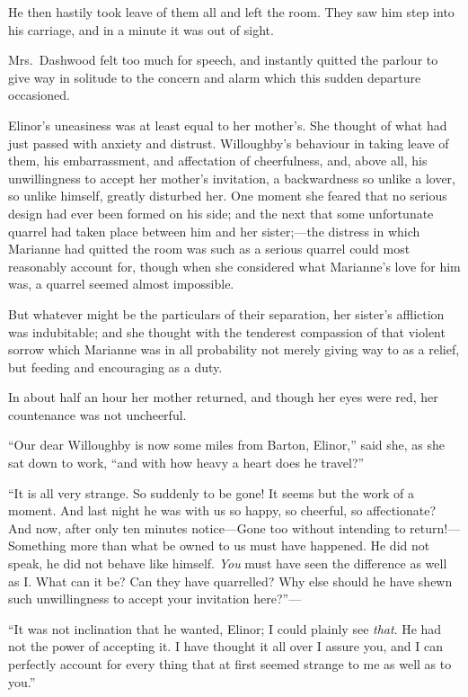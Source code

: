 \documentclass{article}
\begin{document}
He then hastily took leave of them all and left
the room.  They saw him step into his carriage,
and in a minute it was out of sight.

Mrs.\ Dashwood felt too much for speech, and instantly
quitted the parlour to give way in solitude to the concern
and alarm which this sudden departure occasioned.

Elinor's uneasiness was at least equal to her mother's.
She thought of what had just passed with anxiety and distrust.
Willoughby's behaviour in taking leave of them, his
embarrassment,
and affectation of cheerfulness, and, above all, his
unwillingness
to accept her mother's invitation, a backwardness so unlike a
lover,
so unlike himself, greatly disturbed her.  One moment she feared
that no serious design had ever been formed on his side; and the
next that some unfortunate quarrel had taken place between him
and
her sister;---the distress in which Marianne had quitted the room
was such as a serious quarrel could most reasonably account for,
though when she considered what Marianne's love for him was,
a quarrel seemed almost impossible.

But whatever might be the particulars of their separation,
her sister's affliction was indubitable; and she thought
with the tenderest compassion of that violent sorrow
which Marianne was in all probability not merely giving
way to as a relief, but feeding and encouraging as a duty.

In about half an hour her mother returned, and though
her eyes were red, her countenance was not uncheerful.

``Our dear Willoughby is now some miles from Barton, Elinor,''
said she, as she sat down to work, ``and with how heavy a heart
does he travel?''

``It is all very strange.  So suddenly to be gone! It
seems but the work of a moment.  And last night he was
with us so happy, so cheerful, so affectionate?  And now,
after only ten minutes notice---Gone too without intending
to return!---Something more than what be owned to us must
have happened.  He did not speak, he did not behave
like himself.  \emph{You} must have seen the difference as well as I.
What can it be?  Can they have quarrelled?  Why else should he
have shewn such unwillingness to accept your invitation here?''---%

``It was not inclination that he wanted, Elinor; I could
plainly see \emph{that}.  He had not the power of accepting it.
I have thought it all over I assure you, and I can
perfectly account for every thing that at first seemed
strange to me as well as to you.''
\end{document}
